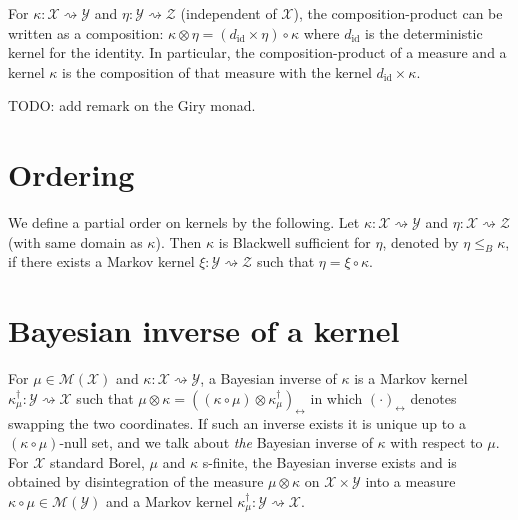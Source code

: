 For $\kappa : \mathcal X \rightsquigarrow \mathcal Y$ and $\eta : \mathcal Y \rightsquigarrow \mathcal Z$ (independent of $\mathcal X$), the composition-product can be written as a composition: $\kappa \otimes \eta = (d_{\text{id}} \times \eta) \circ \kappa$ where $d_{\text{id}}$ is the deterministic kernel for the identity.
In particular, the composition-product of a measure and a kernel $\kappa$ is the composition of that measure with the kernel $d_{\text{id}} \times \kappa$.

TODO: add remark on the Giry monad.

\section{Ordering}

\begin{definition}
  \label{def:blackwellOrder}
  We define a partial order on kernels by the following. Let $\kappa : \mathcal X \rightsquigarrow \mathcal Y$ and $\eta : \mathcal X \rightsquigarrow \mathcal Z$ (with same domain as $\kappa$).
  Then $\kappa$ is Blackwell sufficient for $\eta$, denoted by $\eta \le_B \kappa$, if there exists a Markov kernel $\xi : \mathcal Y \rightsquigarrow \mathcal Z$ such that $\eta = \xi \circ \kappa$.
\end{definition}

\section{Bayesian inverse of a kernel}

\begin{definition}
  \label{def:bayesInv}
  For $\mu \in \mathcal M(\mathcal X)$ and $\kappa : \mathcal X \rightsquigarrow \mathcal Y$, a Bayesian inverse of $\kappa$ is a Markov kernel $\kappa_\mu^\dagger : \mathcal Y \rightsquigarrow \mathcal X$ such that $\mu \otimes \kappa = ((\kappa \circ \mu) \otimes \kappa_\mu^\dagger)_\leftrightarrow$ in which $(\cdot)_\leftrightarrow$ denotes swapping the two coordinates.
  If such an inverse exists it is unique up to a $(\kappa \circ \mu)$-null set, and we talk about \emph{the} Bayesian inverse of $\kappa$ with respect to $\mu$.
  For $\mathcal X$ standard Borel, $\mu$ and $\kappa$ s-finite, the Bayesian inverse exists and is obtained by disintegration of the measure $\mu \otimes \kappa$ on $\mathcal X \times \mathcal Y$ into a measure $\kappa \circ \mu \in \mathcal M(\mathcal Y)$ and a Markov kernel $\kappa_\mu^\dagger: \mathcal Y \rightsquigarrow \mathcal X$.
\end{definition}


